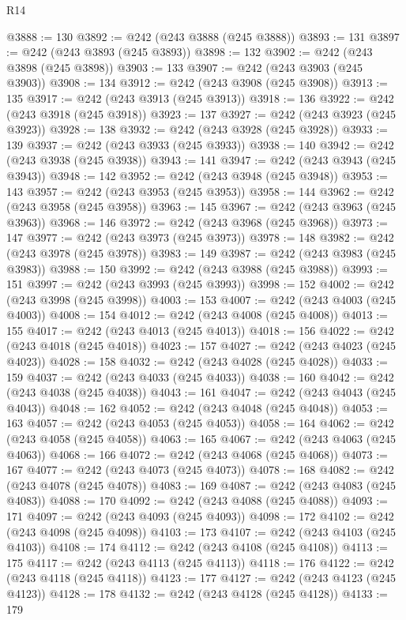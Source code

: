 \begin{lexlean}{R14}
\begin{coremodule}
@3888 := 130
@3892 := @242 (@243 @3888 (@245 @3888))
@3893 := 131
@3897 := @242 (@243 @3893 (@245 @3893))
@3898 := 132
@3902 := @242 (@243 @3898 (@245 @3898))
@3903 := 133
@3907 := @242 (@243 @3903 (@245 @3903))
@3908 := 134
@3912 := @242 (@243 @3908 (@245 @3908))
@3913 := 135
@3917 := @242 (@243 @3913 (@245 @3913))
@3918 := 136
@3922 := @242 (@243 @3918 (@245 @3918))
@3923 := 137
@3927 := @242 (@243 @3923 (@245 @3923))
@3928 := 138
@3932 := @242 (@243 @3928 (@245 @3928))
@3933 := 139
@3937 := @242 (@243 @3933 (@245 @3933))
@3938 := 140
@3942 := @242 (@243 @3938 (@245 @3938))
@3943 := 141
@3947 := @242 (@243 @3943 (@245 @3943))
@3948 := 142
@3952 := @242 (@243 @3948 (@245 @3948))
@3953 := 143
@3957 := @242 (@243 @3953 (@245 @3953))
@3958 := 144
@3962 := @242 (@243 @3958 (@245 @3958))
@3963 := 145
@3967 := @242 (@243 @3963 (@245 @3963))
@3968 := 146
@3972 := @242 (@243 @3968 (@245 @3968))
@3973 := 147
@3977 := @242 (@243 @3973 (@245 @3973))
@3978 := 148
@3982 := @242 (@243 @3978 (@245 @3978))
@3983 := 149
@3987 := @242 (@243 @3983 (@245 @3983))
@3988 := 150
@3992 := @242 (@243 @3988 (@245 @3988))
@3993 := 151
@3997 := @242 (@243 @3993 (@245 @3993))
@3998 := 152
@4002 := @242 (@243 @3998 (@245 @3998))
@4003 := 153
@4007 := @242 (@243 @4003 (@245 @4003))
@4008 := 154
@4012 := @242 (@243 @4008 (@245 @4008))
@4013 := 155
@4017 := @242 (@243 @4013 (@245 @4013))
@4018 := 156
@4022 := @242 (@243 @4018 (@245 @4018))
@4023 := 157
@4027 := @242 (@243 @4023 (@245 @4023))
@4028 := 158
@4032 := @242 (@243 @4028 (@245 @4028))
@4033 := 159
@4037 := @242 (@243 @4033 (@245 @4033))
@4038 := 160
@4042 := @242 (@243 @4038 (@245 @4038))
@4043 := 161
@4047 := @242 (@243 @4043 (@245 @4043))
@4048 := 162
@4052 := @242 (@243 @4048 (@245 @4048))
@4053 := 163
@4057 := @242 (@243 @4053 (@245 @4053))
@4058 := 164
@4062 := @242 (@243 @4058 (@245 @4058))
@4063 := 165
@4067 := @242 (@243 @4063 (@245 @4063))
@4068 := 166
@4072 := @242 (@243 @4068 (@245 @4068))
@4073 := 167
@4077 := @242 (@243 @4073 (@245 @4073))
@4078 := 168
@4082 := @242 (@243 @4078 (@245 @4078))
@4083 := 169
@4087 := @242 (@243 @4083 (@245 @4083))
@4088 := 170
@4092 := @242 (@243 @4088 (@245 @4088))
@4093 := 171
@4097 := @242 (@243 @4093 (@245 @4093))
@4098 := 172
@4102 := @242 (@243 @4098 (@245 @4098))
@4103 := 173
@4107 := @242 (@243 @4103 (@245 @4103))
@4108 := 174
@4112 := @242 (@243 @4108 (@245 @4108))
@4113 := 175
@4117 := @242 (@243 @4113 (@245 @4113))
@4118 := 176
@4122 := @242 (@243 @4118 (@245 @4118))
@4123 := 177
@4127 := @242 (@243 @4123 (@245 @4123))
@4128 := 178
@4132 := @242 (@243 @4128 (@245 @4128))
@4133 := 179

\end{coremodule}
\end{lexlean}

